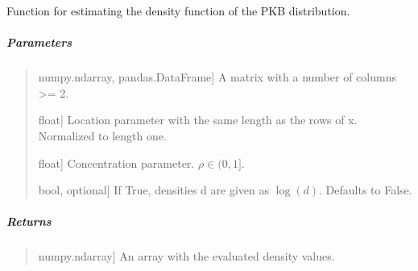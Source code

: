 \documentclass[letterpaper,10pt,english,openany,oneside]{sphinxmanual}
\begin{document}
\begin{fulllineitems}
\label{\detokenize{api_reference/generated/QuadratiK.spherical_clustering.PKBD:QuadratiK.spherical_clustering.PKBD.dpkb}}
\pysigstartsignatures
{}
\pysigstopsignatures
\sphinxAtStartPar
Function for estimating the density function of the PKB distribution.


\subparagraph{Parameters}
\label{\detokenize{api_reference/generated/QuadratiK.spherical_clustering.PKBD:parameters}}\begin{quote}
\begin{description}
\sphinxlineitem{x}{[}numpy.ndarray, pandas.DataFrame{]}
\sphinxAtStartPar
A matrix with a number of columns \textgreater{}= 2.

\sphinxlineitem{mu}{[}float{]}
\sphinxAtStartPar
Location parameter with the same length as the rows of x. Normalized to length one.

\sphinxlineitem{rho}{[}float{]}
\sphinxAtStartPar
Concentration parameter. \(\rho \in (0,1]\).

\sphinxlineitem{logdens}{[}bool, optional{]}
\sphinxAtStartPar
If True, densities d are given as \(\log(d)\). Defaults to False.

\end{description}
\end{quote}


\subparagraph{Returns}
\label{\detokenize{api_reference/generated/QuadratiK.spherical_clustering.PKBD:returns}}\begin{quote}
\begin{description}
\sphinxlineitem{density}{[}numpy.ndarray{]}
\sphinxAtStartPar
An array with the evaluated density values.

\end{description}
\end{quote}

\end{fulllineitems}

\end{document}
